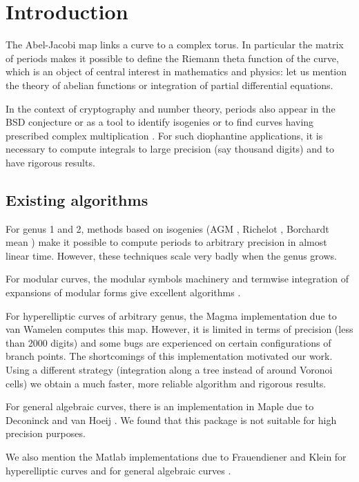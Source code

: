 \documentclass[main.tex]{subfiles}
\begin{document}
  \section{Introduction}

  The Abel-Jacobi map links a curve to a complex torus.
  In particular the matrix of periods makes it possible to define the Riemann
  theta function of the curve, which is an object of central interest in
  mathematics and physics: let us
  mention the theory of abelian functions or integration of partial differential
  equations.

  In the context of cryptography and number theory, periods also appear
  in the BSD conjecture or as a tool to identify isogenies or to find
  curves having prescribed complex multiplication \cite{vanWamelen06}.
  For such diophantine applications, it is necessary to compute
  integrals to large precision (say thousand digits) and to have
  rigorous results.

  \subsection{Existing algorithms}

  For genus 1 and 2, methods based on isogenies (AGM \cite{CremonaAGM13},
  Richelot \cite{BostMestre88}, Borchardt mean \cite{Labrande16})
  make it possible to compute periods to arbitrary precision in almost
  linear time. However, these techniques scale very badly when the genus grows.

  For modular curves, the modular symbols machinery and termwise integration of
  expansions of modular forms give excellent algorithms
  \cite[\S 3.2]{Mascot13}.

  For hyperelliptic curves of arbitrary genus, the Magma implementation
  due to van Wamelen \cite{vanWamelen06} computes this map.
  However, it is limited in terms of precision (less
  than 2000 digits) and some bugs are experienced on
  certain configurations of branch points. The shortcomings of this implementation motivated our
  work. Using a different strategy
  (integration along a tree instead of around Voronoi cells)
  we obtain a much faster, more reliable algorithm and rigorous results.

  For general algebraic curves, there is an implementation in Maple
  due to Deconinck and van Hoeij \cite{DeconinckvanHoeij01}.
  We found that this package is not suitable for high precision purposes.

  We also mention the Matlab implementations due to Frauendiener and Klein for hyperelliptic curves \cite{FrauendienerKlein2015} 
  and for general algebraic curves \cite{FrauendienerKlein2011}. 
  
\end{document}
